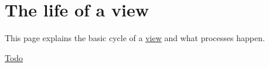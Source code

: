 \hypertarget{group__views__lifetime}{
\section{The life of a view}
\label{group__views__lifetime}
}
This page explains the basic cycle of a \hyperlink{classview}{view} and what processes happen.

\begin{Desc}
\item[\hyperlink{todo__todo000087}{Todo}]\end{Desc}
